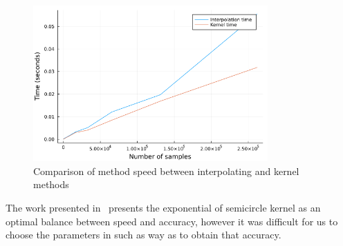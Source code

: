 \begin{figure}[htpb!]
    \centering
    \includegraphics[width=0.8\textwidth]{images/speed.png}
    \caption{Comparison of method speed between interpolating and kernel methods}
    \label{fig:images-speed-png}
\end{figure}

The work presented in~\cite{IEEE-2021-Barnett} presents the exponential of semicircle kernel as an optimal balance between speed and accuracy, however it was difficult for us to choose the parameters in such as way as to obtain that accuracy.
